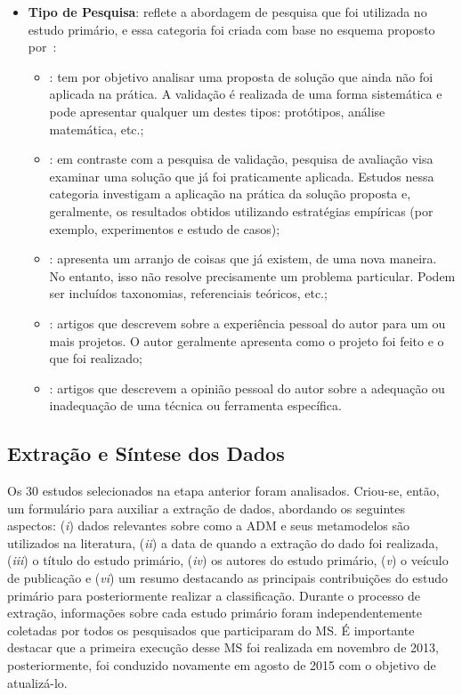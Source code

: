 \begin{itemize}
        \item \textbf{Tipo de Pesquisa}: reflete a abordagem de pesquisa que foi utilizada no estudo primário, e essa categoria foi criada com base no esquema proposto por~:
        
        \begin{itemize}
            \item {}: tem por objetivo analisar uma proposta de solução que ainda não foi aplicada na prática. A validação é realizada de uma forma sistemática e pode apresentar qualquer um destes tipos: protótipos, análise matemática, etc.;
            \item {}: em contraste com a pesquisa de validação, pesquisa de avaliação visa examinar uma solução que já foi praticamente aplicada. Estudos nessa categoria investigam a aplicação na prática da solução proposta e, geralmente, os resultados obtidos utilizando estratégias empíricas (por exemplo, experimentos e estudo de casos);
            \item {}: apresenta um arranjo de coisas que já existem, de uma nova maneira. No entanto, isso não resolve precisamente um problema particular. Podem ser incluídos taxonomias, referenciais teóricos, etc.;
            \item {}: artigos que descrevem sobre a experiência pessoal do autor para um ou mais projetos. O autor geralmente apresenta como o projeto foi feito e o que foi realizado;
            \item {}: artigos que descrevem a opinião pessoal do autor sobre a adequação ou inadequação de uma técnica ou ferramenta específica.
        \end{itemize}
    
\end{itemize}


\subsection{Extração e Síntese dos Dados}\label{subsec:extracao_e_sintese_do_dados}

Os 30 estudos selecionados na etapa anterior foram analisados. Criou-se, então, um formulário para auxiliar a extração de dados, abordando os seguintes aspectos: (\textit{i}) dados relevantes sobre como a ADM e seus metamodelos são utilizados na literatura, (\textit{ii}) a data de quando a extração do dado foi realizada, (\textit{iii}) o título do estudo primário, (\textit{iv}) os autores do estudo primário, (\textit{v}) o veículo de publicação e (\textit{vi}) um resumo destacando as principais contribuições do estudo primário para posteriormente realizar a classificação. Durante o processo de extração, informações sobre cada estudo primário foram independentemente coletadas por todos os pesquisados que participaram do MS. É importante destacar que a primeira execução desse MS foi realizada em novembro de 2013, posteriormente, foi conduzido novamente em agosto de 2015 com o objetivo de atualizá-lo.

